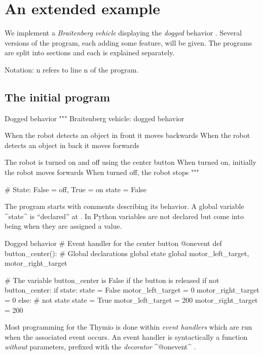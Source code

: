 \documentclass[11pt,a4paper]{article}
\newcommand*{\li}[1]{{\footnotesize\textsf{\ddag #1}}}
\begin{document}

\section{An extended example}\label{s.example}

We implement a \emph{Braitenberg vehicle} displaying the \emph{dogged} behavior \cite[Chapter~3]{elements}. Several versions of the program, each adding some feature, will be given. The programs are split into sections and each is explained separately.

Notation: \li{n} refers to line \textsf{n} of the program.

\subsection*{The initial program}

\begin{progln}{Dogged behavior}
"""
  Braitenberg vehicle: dogged behavior

  When the robot detects an object in front it moves backwards
  When the robot detects an object in back it moves forwards

  The robot is turned on and off using the center button
    When turned on, initially the robot moves forwards
    When turned off, the robot stops
"""

# State: False = off, True = on
state = False
\end{progln}

The program starts with comments describing its behavior. A global variable ^state^ is ``declared'' at \li{13}. In Python variables are not declared but come into being when they are assigned a value.

\begin{proglnn}{Dogged behavior}
# Event handler for the center button
@onevent
def button_center():
    # Global declarations
    global state
    global motor_left_target, motor_right_target

    # The variable button_center is False if the button is released
    if not button_center:
        if state:
            state = False
            motor_left_target = 0
            motor_right_target = 0
        else:  # not state
            state = True
            motor_left_target = 200
            motor_right_target = 200
\end{proglnn}

Most programming for the Thymio is done within \emph{event handlers} which are run when the associated event occurs. An event handler is syntactically a function \emph{without} parameters, prefixed with the \emph{decorator} ^@onevent^ \li{15}.
\end{document}
